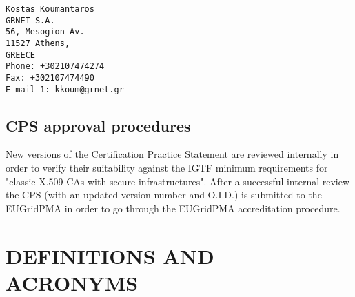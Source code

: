 \begin{verbatim}
Kostas Koumantaros
GRNET S.A.
56, Mesogion Av.
11527 Athens,
GREECE
Phone: +302107474274
Fax: +302107474490
E-mail 1: kkoum@grnet.gr
\end{verbatim}


\subsection{CPS approval procedures}
\label{sub:CPSApprovalProcedures}

New versions of the Certification Practice Statement are reviewed internally in order to verify their suitability against the IGTF minimum requirements for "classic X.509 CAs with secure infrastructures".  After a successful internal review the CPS (with an updated version number and O.I.D.) is submitted to the EUGridPMA in order to go through the EUGridPMA accreditation procedure.

\newpage

\section{DEFINITIONS AND ACRONYMS}


